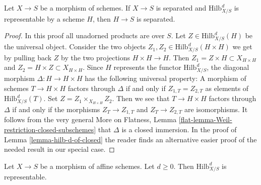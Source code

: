 \begin{lemma}
\label{lemma-hilb-d-separated}
Let $X \to S$ be a morphism of schemes. If $X \to S$ is separated and
$\text{Hilb}^d_{X/S}$ is representable by a scheme $H$,
then $H \to S$ is separated.
\end{lemma}

\begin{proof}
In this proof all unadorned products are over $S$.
Let $Z \in \text{Hilb}^d_{X/S}(H)$ be the universal object.
Consider the two objects $Z_1, Z_2 \in \text{Hilb}^d_{X/S}(H \times H)$
we get by pulling back $Z$ by the two projections $H \times H \to H$.
Then $Z_1 = Z \times H \subset X_{H \times H}$ and $Z_2 = H \times Z
\subset X_{H \times H}$. Since $H$ represents the functor
$\text{Hilb}^d_{X/S}$, the diagonal morphism $\Delta : H \to H \times H$
has the following universal property: A morphism of schemes
$T \to H \times H$ factors through $\Delta$ if and only if
$Z_{1, T} = Z_{2, T}$ as elements of $\text{Hilb}^d_{X/S}(T)$.
Set $Z = Z_1 \times_{X_{H \times H}} Z_2$. Then we see that
$T \to H \times H$ factors through $\Delta$ if and only if
the morphisms $Z_T \to Z_{1, T}$ and $Z_T \to Z_{2, T}$ are
isomorphisms. It follows from the very general
More on Flatness, Lemma \ref{flat-lemma-Weil-restriction-closed-subschemes}
that $\Delta$ is a closed immersion. In the proof of
Lemma \ref{lemma-hilb-d-of-closed}
the reader finds an alternative easier proof of the needed result
in our special case.
\end{proof}

\begin{lemma}
\label{lemma-hilb-d-An}
Let $X \to S$ be a morphism of affine schemes. Let $d \geq 0$. Then
$\text{Hilb}^d_{X/S}$ is representable.
\end{lemma}

